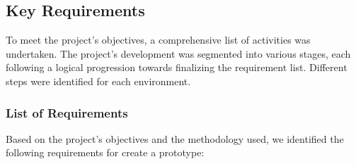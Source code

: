 \documentclass[12pt]{article}
\begin{document}
\subsection{Key Requirements}

To meet the project's objectives, a comprehensive list of activities was undertaken. The project's development was segmented into various stages, each following a logical progression towards finalizing the requirement list. Different steps were identified for each environment.

\subsubsection{List of Requirements}

Based on the project's objectives and the methodology used, we identified the following requirements for create a prototype:
\end{document}
